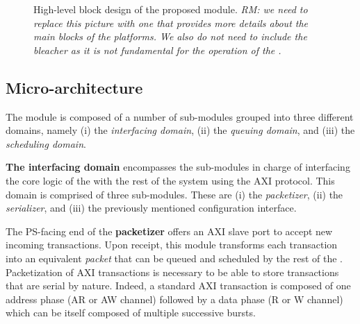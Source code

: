 
\begin{figure}
  \centering
  
  \caption{High-level block design of the proposed \schim
    module. \emph{RM: we need to replace this picture with one that
      provides more details about the main blocks of the platforms. We
      also do not need to include the bleacher as it is not
      fundamental for the operation of the \schim.}}
  \label{fig:SchIM_overview_schema}
\end{figure}



\subsection{Micro-architecture}
\label{subsec:micro-arch}

The \schim module is composed of a number of sub-modules grouped into
three different domains, namely (i) the \emph{interfacing domain},
(ii) the \emph{queuing domain}, and (iii) the \emph{scheduling
  domain}.

\par{\bf The interfacing domain} encompasses the sub-modules in charge
of interfacing the core logic of the \schim with the rest of the
system using the AXI protocol.  This domain is comprised of three
sub-modules. These are (i) the \emph{packetizer}, (ii) the
\emph{serializer}, and (iii) the previously mentioned configuration
interface.

The PS-facing end of the {\bf packetizer} offers an AXI slave port to
accept new incoming transactions. Upon receipt, this module transforms
each transaction into an equivalent \emph{packet} that can be queued
and scheduled by the rest of the \schim. Packetization of AXI
transactions is necessary to be able to store transactions that are
serial by nature.  Indeed, a standard AXI transaction is composed of
one address phase (AR or AW channel) followed by a data phase (R or W
channel) which can be itself composed of multiple successive bursts.

